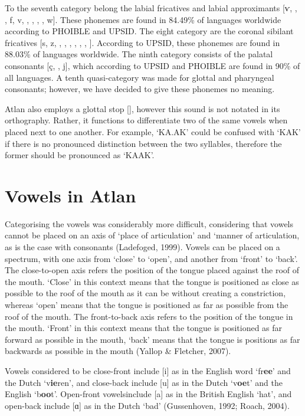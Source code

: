 To the seventh category belong the labial fricatives and labial approximants [ⱱ, \textphi, \textbeta, f, v, \texttheta, \dh, \textscriptv , \textturnw, w]. These phonemes are found in 84.49\% of languages worldwide according to PHOIBLE and UPSID. The eight category are the coronal sibilant fricatives [s, z, \textesh, \textyogh, \textrtails , \textrtailz, \textctc, \textctz,  \texththeng]. According to UPSID, these phonemes are found in 88.03\% of languages worldwide. The ninth category consists of the palatal consonants [\c{c}, \textctj, j], which according to UPSID and PHOIBLE are found in 90\% of all languages. A tenth quasi-category was made for glottal and pharyngeal consonants; however, we have decided to give these phonemes no meaning. 

Atlan also employs a glottal stop [\textglotstop], however this sound is not notated in its orthography. Rather, it functions to differentiate two of the same vowels when placed next to one another. For example, ‘KA.AK’ could be confused with ‘KAK’ if there is no pronounced distinction between the two syllables, therefore the former should be pronounced as ‘KA\textglotstop AK’. 


\section{Vowels in Atlan}

Categorising the vowels was considerably more difficult, considering that vowels cannot be placed on an axis of ‘place of articulation’ and ‘manner of articulation, as is the case with consonants (Ladefoged, 1999). Vowels can be placed on a spectrum, with one axis from ‘close’ to ‘open’, and another from ‘front’ to ‘back’. The close-to-open axis refers the position of the tongue placed against the roof of the mouth. ‘Close’ in this context means that the tongue is positioned as close as possible to the roof of the mouth as it can be without creating a constriction, whereas ‘open’ means that the tongue is positioned as far as possible from the roof of the mouth. The front-to-back axis refers to the position of the tongue in the mouth. ‘Front’ in this context means that the tongue is positioned as far forward as possible in the mouth, ‘back’ means that the tongue is positions as far backwards as possible in the mouth (Yallop \& Fletcher, 2007). 

Vowels considered to be close-front include [i] as in the English word ‘fr{\bf ee}’ and the Dutch ‘v{\bf ie}ren’, and close-back include [u] as in the Dutch ‘v{\bf oe}t’ and the English ‘b{\bf oo}t’. Open-front vowelsinclude [a] as in the British English ‘hat’, and open-back include [ɑ] as in the Dutch ‘bad’ (Gussenhoven, 1992; Roach, 2004). 

